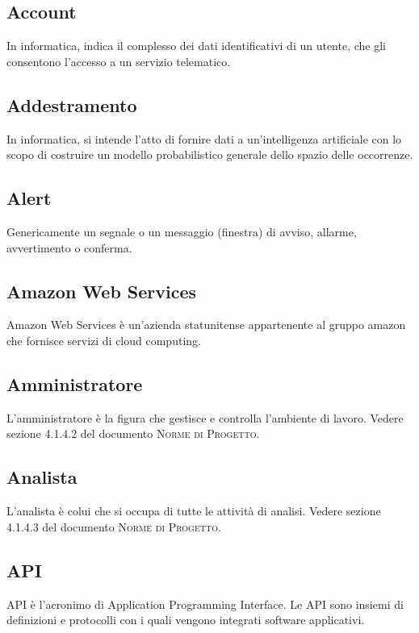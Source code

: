 

\subsection*{Account}
In informatica, indica il complesso dei dati identificativi di un utente, che gli consentono l'accesso a un servizio telematico.

\subsection*{Addestramento}
In informatica, si intende l'atto di fornire dati a un'intelligenza artificiale con lo scopo di costruire un modello probabilistico generale dello spazio delle occorrenze.

\subsection*{Alert}
Genericamente un segnale o un messaggio (finestra) di avviso, allarme, avvertimento o conferma.

\subsection*{Amazon Web Services}
Amazon Web Services è un'azienda statunitense appartenente al gruppo amazon che fornisce servizi di cloud computing.

\subsection*{Amministratore}
L’amministratore è la figura che gestisce e controlla l’ambiente di lavoro. Vedere sezione 4.1.4.2 del documento \textsc{Norme di Progetto}.

\subsection*{Analista}
L’analista è colui che si occupa di tutte le attività di analisi. Vedere sezione 4.1.4.3 del documento \textsc{Norme di Progetto}.

\subsection*{API}
API è l'acronimo di Application Programming Interface. Le API sono insiemi di definizioni e protocolli con i quali vengono integrati software applicativi.


